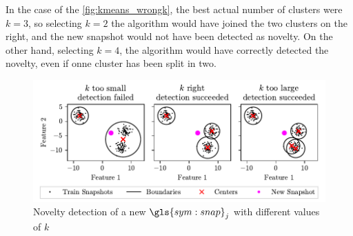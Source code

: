 In the case of the \autoref{fig:kmeans_wrongk}, the best actual number of clusters were $k=3$, so selecting $k=2$ the algorithm would have joined the two clusters on the right, and the new snapshot would not have been detected as novelty. On the other hand, selecting $k=4$, the algorithm would have correctly detected the novelty, even if onne cluster has been split in two.

\begin{figure}
  \centering
  \includegraphics[width=\textwidth]{images/Kmeans_wrongk.pdf}
  \caption{Novelty detection of a new $\gls{sym:snap}_j$ with different values of $k$}
  \label{fig:kmeans_wrongk}
\end{figure}

